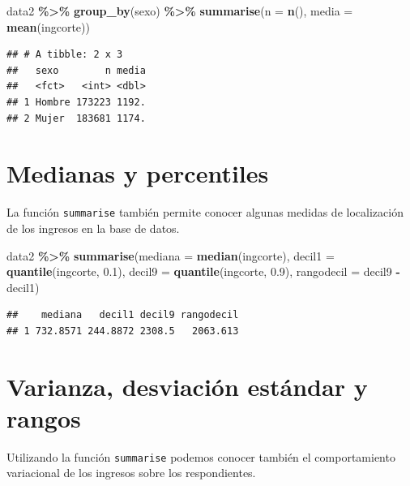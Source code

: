 \documentclass[
  spanish,
  12pt,
]{book}
\newenvironment{Shaded}{\begin{snugshade}}{\end{snugshade}}
\newcommand{\AttributeTok}[1]{\textcolor[rgb]{0.13,0.29,0.53}{#1}}
\newcommand{\FloatTok}[1]{\textcolor[rgb]{0.00,0.00,0.81}{#1}}
\newcommand{\FunctionTok}[1]{\textcolor[rgb]{0.13,0.29,0.53}{\textbf{#1}}}
\newcommand{\NormalTok}[1]{#1}
\newcommand{\SpecialCharTok}[1]{\textcolor[rgb]{0.81,0.36,0.00}{\textbf{#1}}}
\begin{document}
\begin{Shaded}
\begin{Highlighting}[]
\NormalTok{data2 }\SpecialCharTok{\%\textgreater{}\%} \FunctionTok{group\_by}\NormalTok{(sexo) }\SpecialCharTok{\%\textgreater{}\%}
  \FunctionTok{summarise}\NormalTok{(}\AttributeTok{n =} \FunctionTok{n}\NormalTok{(),}
            \AttributeTok{media =} \FunctionTok{mean}\NormalTok{(ingcorte))}
\end{Highlighting}
\end{Shaded}

\begin{verbatim}
## # A tibble: 2 x 3
##   sexo        n media
##   <fct>   <int> <dbl>
## 1 Hombre 173223 1192.
## 2 Mujer  183681 1174.
\end{verbatim}

\section{Medianas y percentiles}\label{medianas-y-percentiles}

La función \texttt{summarise} también permite conocer algunas medidas de localización de los ingresos en la base de datos.

\begin{Shaded}
\begin{Highlighting}[]
\NormalTok{data2 }\SpecialCharTok{\%\textgreater{}\%} \FunctionTok{summarise}\NormalTok{(}\AttributeTok{mediana =} \FunctionTok{median}\NormalTok{(ingcorte),}
                    \AttributeTok{decil1 =} \FunctionTok{quantile}\NormalTok{(ingcorte, }\FloatTok{0.1}\NormalTok{),}
                    \AttributeTok{decil9 =} \FunctionTok{quantile}\NormalTok{(ingcorte, }\FloatTok{0.9}\NormalTok{),}
                    \AttributeTok{rangodecil =}\NormalTok{ decil9 }\SpecialCharTok{{-}}\NormalTok{ decil1)}
\end{Highlighting}
\end{Shaded}

\begin{verbatim}
##    mediana   decil1 decil9 rangodecil
## 1 732.8571 244.8872 2308.5   2063.613
\end{verbatim}

\section{Varianza, desviación estándar y rangos}\label{varianza-desviaciuxf3n-estuxe1ndar-y-rangos}

Utilizando la función \texttt{summarise} podemos conocer también el comportamiento variacional de los ingresos sobre los respondientes.
\end{document}
